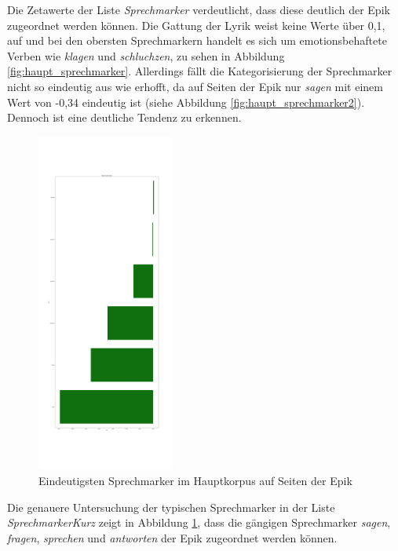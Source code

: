 \documentclass[a4paper,10p]{article}
\begin{document}
Die Zetawerte der Liste \textit{Sprechmarker} verdeutlicht, dass diese deutlich der Epik zugeordnet werden können. Die Gattung der Lyrik weist keine Werte über 0,1, auf und bei den obersten Sprechmarkern handelt es sich um emotionsbehaftete Verben wie \textit{klagen} und \textit{schluchzen}, zu sehen in Abbildung \ref{fig:haupt_sprechmarker}. Allerdings fällt die Kategorisierung der Sprechmarker nicht so eindeutig aus wie erhofft, da auf Seiten der Epik nur \textit{sagen} mit einem Wert von -0,34 eindeutig ist (siehe Abbildung \ref{fig:haupt_sprechmarker2}). Dennoch ist eine deutliche Tendenz zu erkennen. \par 

\begin{figure}
	\includegraphics[width=0.4\textwidth]{haupt_sprechmarkerKurz_pro_wort.png}
	\caption{Eindeutigsten Sprechmarker im Hauptkorpus auf Seiten der Epik}
	\label{fig:haupt_sprechmarkerKurz}
\end{figure}


Die genauere Untersuchung der typischen Sprechmarker in der Liste \textit{SprechmarkerKurz} zeigt in Abbildung \ref{fig:haupt_sprechmarkerKurz}, dass die gängigen Sprechmarker \textit{sagen}, \textit{fragen}, \textit{sprechen} und \textit{antworten} der Epik zugeordnet werden können. \par 
\end{document}
